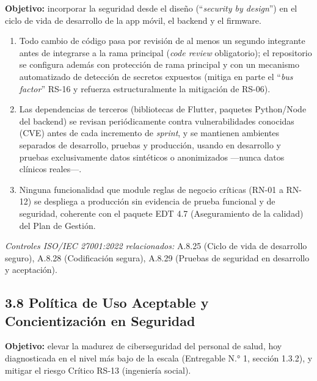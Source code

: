 \documentclass[11pt,a4paper]{article}
\providecommand{\tightlist}{%
  \setlength{\itemsep}{0pt}\setlength{\parskip}{0pt}}
\begin{document}
\textbf{Objetivo:} incorporar la seguridad desde el diseño (``\emph{security by design}'') en el ciclo de vida de desarrollo de la app móvil, el backend y el firmware.

\begin{enumerate}
\def\labelenumi{\arabic{enumi}.}
\tightlist
\item
  Todo cambio de código pasa por revisión de al menos un segundo integrante antes de integrarse a la rama principal (\emph{code review} obligatorio); el repositorio se configura además con protección de rama principal y con un mecanismo automatizado de detección de secretos expuestos (mitiga en parte el ``\emph{bus factor}'' RS-16 y refuerza estructuralmente la mitigación de RS-06).
\item
  Las dependencias de terceros (bibliotecas de Flutter, paquetes Python/Node del backend) se revisan periódicamente contra vulnerabilidades conocidas (CVE) antes de cada incremento de \emph{sprint}, y se mantienen ambientes separados de desarrollo, pruebas y producción, usando en desarrollo y pruebas exclusivamente datos sintéticos o anonimizados ---nunca datos clínicos reales---.
\item
  Ninguna funcionalidad que module reglas de negocio críticas (RN-01 a RN-12) se despliega a producción sin evidencia de prueba funcional y de seguridad, coherente con el paquete EDT 4.7 (Aseguramiento de la calidad) del Plan de Gestión.
\end{enumerate}

\emph{Controles ISO/IEC 27001:2022 relacionados:} A.8.25 (Ciclo de vida de desarrollo seguro), A.8.28 (Codificación segura), A.8.29 (Pruebas de seguridad en desarrollo y aceptación).

\subsection{3.8 Política de Uso Aceptable y Concientización en Seguridad}\label{poluxedtica-de-uso-aceptable-y-concientizaciuxf3n-en-seguridad}

\textbf{Objetivo:} elevar la madurez de ciberseguridad del personal de salud, hoy diagnosticada en el nivel más bajo de la escala (Entregable N.° 1, sección 1.3.2), y mitigar el riesgo Crítico RS-13 (ingeniería social).
\end{document}
